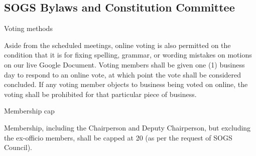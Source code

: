 \subsection{SOGS Bylaws and Constitution Committee}

\begin{longenum}
 \item Voting methods
 \begin{longenum}
 \item Aside from the scheduled meetings, online voting is also permitted on the condition that it is
for fixing spelling, grammar, or wording mistakes on motions on our live Google Document.
Voting members shall be given one (1) business day to respond to an online vote, at which
point the vote shall be considered concluded. If any voting member objects to business being
voted on online, the voting shall be prohibited for that particular piece of business.
 \end{longenum}
 \item Membership cap
  \begin{longenum}
  \item Membership, including the Chairperson and Deputy Chairperson, but excluding the ex-officio
members, shall be capped at 20 (as per the request of SOGS Council).
  \end{longenum}
\end{longenum}